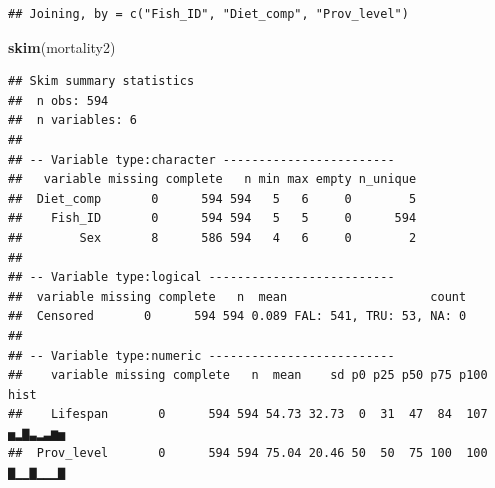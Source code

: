 \documentclass[]{book}
\newenvironment{Shaded}{\begin{snugshade}}{\end{snugshade}}
\newcommand{\DataTypeTok}[1]{\textcolor[rgb]{0.13,0.29,0.53}{#1}}
\newcommand{\DecValTok}[1]{\textcolor[rgb]{0.00,0.00,0.81}{#1}}
\newcommand{\KeywordTok}[1]{\textcolor[rgb]{0.13,0.29,0.53}{\textbf{#1}}}
\newcommand{\NormalTok}[1]{#1}
\newcommand{\OperatorTok}[1]{\textcolor[rgb]{0.81,0.36,0.00}{\textbf{#1}}}
\newcommand{\OtherTok}[1]{\textcolor[rgb]{0.56,0.35,0.01}{#1}}
\newcommand{\StringTok}[1]{\textcolor[rgb]{0.31,0.60,0.02}{#1}}
\begin{document}
\begin{Shaded}
\end{Shaded}

\begin{verbatim}
## Joining, by = c("Fish_ID", "Diet_comp", "Prov_level")
\end{verbatim}

\begin{Shaded}
\begin{Highlighting}[]
\KeywordTok{skim}\NormalTok{(mortality2)}
\end{Highlighting}
\end{Shaded}

\begin{verbatim}
## Skim summary statistics
##  n obs: 594 
##  n variables: 6 
## 
## -- Variable type:character ------------------------
##   variable missing complete   n min max empty n_unique
##  Diet_comp       0      594 594   5   6     0        5
##    Fish_ID       0      594 594   5   5     0      594
##        Sex       8      586 594   4   6     0        2
## 
## -- Variable type:logical --------------------------
##  variable missing complete   n  mean                    count
##  Censored       0      594 594 0.089 FAL: 541, TRU: 53, NA: 0
## 
## -- Variable type:numeric --------------------------
##    variable missing complete   n  mean    sd p0 p25 p50 p75 p100     hist
##    Lifespan       0      594 594 54.73 32.73  0  31  47  84  107 ▅▂▇▃▂▃▆▅
##  Prov_level       0      594 594 75.04 20.46 50  50  75 100  100 ▇▁▁▇▁▁▁▇
\end{verbatim}
\end{document}
